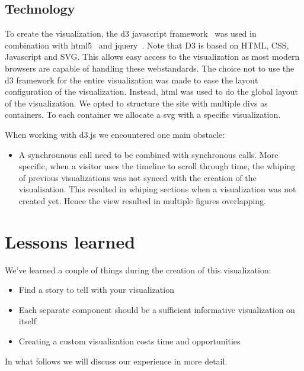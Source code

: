 \documentclass[chi_draft]{sigchi}
\begin{document}
\subsection{Technology}
To create the visualization, the d3 javascript framework~\cite{d3} was used in
combination with html5~\cite{html5} and jquery~\cite{jquery}. Note that D3 is
based on HTML, CSS, Javascript and SVG. This allows easy access to the
visualization as most modern browsers are capable of handling these
webstandards. The choice not to use the d3 framework for the entire
visualization was made to ease the layout configuration of the visualization.
Instead, html was used to do the global layout of the visualization. We opted to
structure the site with multiple divs as containers. To each container we
allocate a svg with a specific visualization.

When working with d3.js we encountered one main obstacle:
\begin{itemize}
        \item A synchrounous call need to be combined with synchronous calls.
            More specific, when a visitor uses the timeline to scroll through
            time, the whiping of previous visualizations was not synced with the
            creation of the visualisation. This resulted in whiping sections
            when a visualization was not created yet. Hence the view resulted in
            multiple figures overlapping.
\end{itemize}


\section{Lessons learned}\label{sec:discussion}
We've learned a couple of things during the creation of this visualization:
\begin{itemize}
    \item Find a story to tell with your visualization
    \item Each separate component should be a sufficient informative visualization on itself
    \item Creating a custom visualization costs time and opportunities
\end{itemize}
In what follows we will discuss our experience in more detail.
\end{document}
